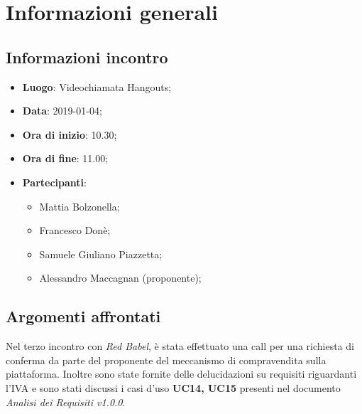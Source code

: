 \section{Informazioni generali}

\subsection{Informazioni incontro}
\begin{itemize}
\item \textbf{Luogo}: Videochiamata Hangouts;
\item \textbf{Data}: 2019-01-04;
\item \textbf{Ora di inizio}: 10.30;
\item \textbf{Ora di fine}: 11.00;
\item \textbf{Partecipanti}:
\begin{itemize}
	\item Mattia Bolzonella;
	\item Francesco Donè;
	\item Samuele Giuliano Piazzetta;
	\item Alessandro Maccagnan (proponente);
\end{itemize}
\end{itemize}

\subsection{Argomenti affrontati}
Nel terzo incontro con \textit{Red Babel}, è stata effettuato una call per una 
richiesta di conferma da parte del proponente del meccanismo di compravendita 
sulla piattaforma. Inoltre sono state fornite delle delucidazioni su requisiti 
riguardanti l’IVA e sono stati discussi i casi d’uso \textbf{UC14, UC15} presenti
nel documento \textit{Analisi dei Requisiti v1.0.0}.

